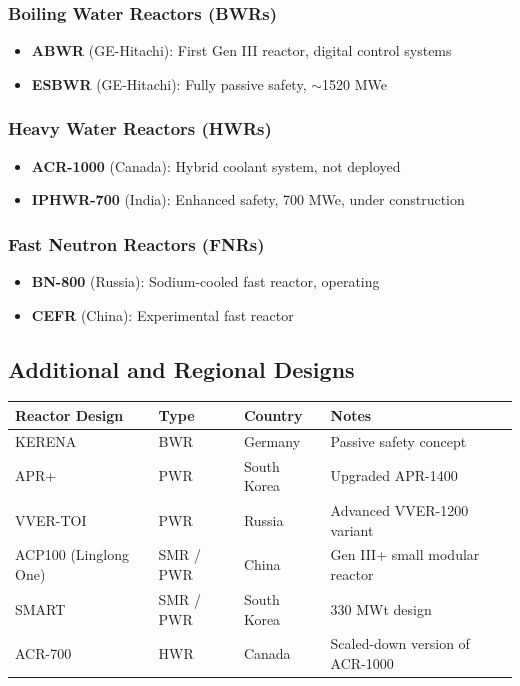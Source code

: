 \documentclass[a4paper,12pt]{article}
\begin{document}
\subsubsection{Boiling Water Reactors (BWRs)}
\begin{itemize}
    \item \textbf{ABWR} (GE-Hitachi): First Gen III reactor, digital control systems
    \item \textbf{ESBWR} (GE-Hitachi): Fully passive safety, $\sim$1520 MWe
\end{itemize}

\subsubsection{Heavy Water Reactors (HWRs)}
\begin{itemize}
    \item \textbf{ACR-1000} (Canada): Hybrid coolant system, not deployed
    \item \textbf{IPHWR-700} (India): Enhanced safety, 700 MWe, under construction
\end{itemize}

\subsubsection{Fast Neutron Reactors (FNRs)}
\begin{itemize}
    \item \textbf{BN-800} (Russia): Sodium-cooled fast reactor, operating
    \item \textbf{CEFR} (China): Experimental fast reactor
\end{itemize}

\subsection{Additional and Regional Designs}
\begin{longtable}{p{4cm}p{3cm}p{3cm}p{5cm}}
\toprule
\textbf{Reactor Design} & \textbf{Type} & \textbf{Country} & \textbf{Notes} \\
\midrule
KERENA & BWR & Germany & Passive safety concept \\
APR+ & PWR & South Korea & Upgraded APR-1400 \\
VVER-TOI & PWR & Russia & Advanced VVER-1200 variant \\
ACP100 (Linglong One) & SMR / PWR & China & Gen III+ small modular reactor \\
SMART & SMR / PWR & South Korea & 330 MWt design \\
ACR-700 & HWR & Canada & Scaled-down version of ACR-1000 \\
\bottomrule
\end{longtable}
\end{document}
